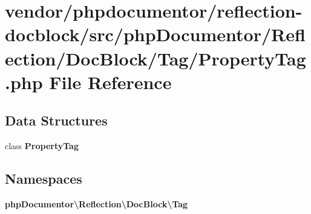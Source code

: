 \section{vendor/phpdocumentor/reflection-\/docblock/src/php\+Documentor/\+Reflection/\+Doc\+Block/\+Tag/\+Property\+Tag.php File Reference}
\label{_property_tag_8php}
\subsection*{Data Structures}
\begin{DoxyCompactItemize}
\item 
class {\bf Property\+Tag}
\end{DoxyCompactItemize}
\subsection*{Namespaces}
\begin{DoxyCompactItemize}
\item 
 {\bf php\+Documentor\textbackslash{}\+Reflection\textbackslash{}\+Doc\+Block\textbackslash{}\+Tag}
\end{DoxyCompactItemize}
